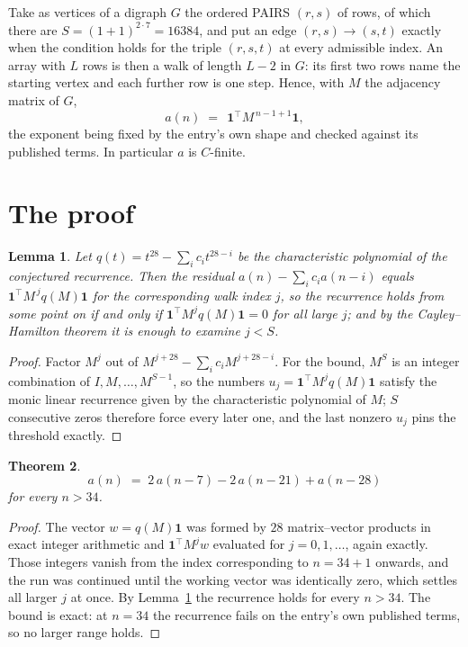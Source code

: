 \documentclass[11pt,a4paper]{article}
\theoremstyle{plain}
\newtheorem{theorem}{Theorem}
\newtheorem{lemma}[theorem]{Lemma}
\theoremstyle{definition}
\begin{document}
Take as vertices of a digraph $G$ the ordered PAIRS $(r,s)$ of rows, of which there are
$S=(1+1)^{2\cdot7}=16384$, and put an edge $(r,s)\to(s,t)$ exactly when the condition
holds for the triple $(r,s,t)$ at every admissible index. An array with $L$ rows is then a
walk of length $L-2$ in $G$: its first two rows name the starting vertex and each further
row is one step. Hence, with $M$ the adjacency matrix of $G$,
\[
a(n)\;=\;\,\mathbf{1}^{\!\top}M^{\,n-1+1}\mathbf{1},
\]
the exponent being fixed by the entry's own shape and checked against its published terms.
In particular $a$ is $C$-finite.

\section{The proof}

\begin{lemma}\label{lem:crit}
Let $q(t)=t^{28}-\sum_i c_it^{28-i}$ be the characteristic polynomial of the
conjectured recurrence. Then the residual $a(n)-\sum_ic_ia(n-i)$ equals
$\mathbf{1}^{\!\top}M^{\,j}q(M)\mathbf{1}$ for the corresponding walk index
$j$, so the recurrence holds from some point on if and only if
$\mathbf{1}^{\!\top}M^{j}q(M)\mathbf{1}=0$ for all large $j$; and by the
Cayley--Hamilton theorem it is enough to examine $j<S$.
\end{lemma}

\begin{proof}
Factor $M^{j}$ out of $M^{j+28}-\sum_ic_iM^{j+28-i}$. For the bound, $M^{S}$
is an integer combination of $I,M,\dots,M^{S-1}$, so the numbers
$u_j=\mathbf{1}^{\!\top}M^{j}q(M)\mathbf{1}$ satisfy the monic linear recurrence given by
the characteristic polynomial of $M$; $S$ consecutive zeros therefore force every later one,
and the last nonzero $u_j$ pins the threshold exactly.
\end{proof}

\begin{theorem}
\[
a(n)\;=\;2\,a(n-7) - 2\,a(n-21) + a(n-28)
\]
for every $n>34$.
\end{theorem}

\begin{proof}
The vector $w=q(M)\mathbf{1}$ was formed by $28$ matrix--vector products in exact
integer arithmetic and $\mathbf{1}^{\!\top}M^{j}w$ evaluated for $j=0,1,\dots$, again
exactly. Those integers vanish from the index corresponding to $n=34+1$ onwards, and the
run was continued until the working vector was identically zero, which settles all larger $j$
at once. By Lemma~\ref{lem:crit} the recurrence holds for every $n>34$. The bound is exact: at $n=34$ the recurrence fails on the entry's own published terms, so no larger range holds.
\end{proof}
\end{document}
